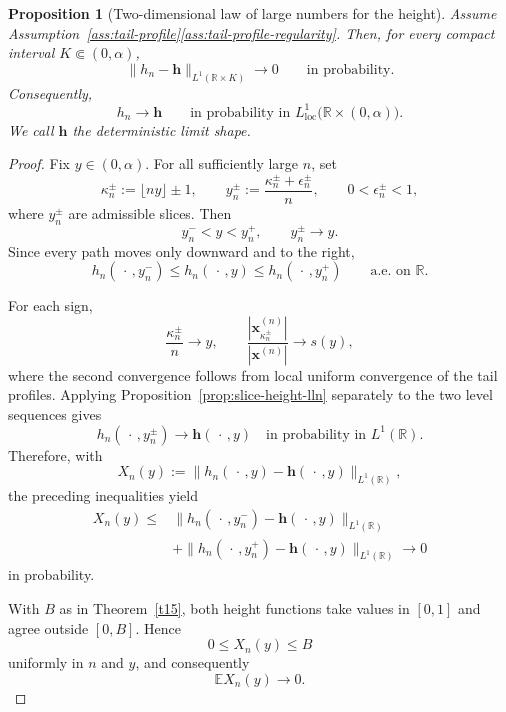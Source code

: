 \documentclass[11pt]{amsart}
\theoremstyle{plain}
\newtheorem{proposition}[theorem]{Proposition}
\numberwithin{equation}{section}
\numberwithin{theorem}{section}
\numberwithin{figure}{section}
\begin{document}
\begin{proposition}[Two-dimensional law of large numbers for the height]
\label{prop:two-dimensional-height-lln}
Assume
Assumption~\ref{ass:tail-profile}\ref{ass:tail-profile-regularity}.
Then, for every compact interval \(K\Subset(0,\alpha)\),
\begin{equation}
    \lVert h_n-\mathbf h\rVert_{L^1(\mathbb R\times K)}
    \longrightarrow0
    \qquad\text{in probability}.
    \label{eq:two-dimensional-height-lln}
\end{equation}
Consequently,
\[
    h_n\longrightarrow\mathbf h
    \qquad\text{in probability in }
    L^1_{\mathrm{loc}}
    \bigl(\mathbb R\times(0,\alpha)\bigr).
\]
We call \(\mathbf h\) the deterministic limit shape.
\end{proposition}

\begin{proof}
Fix \(y\in(0,\alpha)\). For all sufficiently large \(n\), set
\[
    \kappa_n^\pm:=\lfloor ny\rfloor\pm1,
    \qquad
    y_n^\pm
    :=
    \frac{\kappa_n^\pm+\epsilon_n^\pm}{n},
    \qquad
    0<\epsilon_n^\pm<1,
\]
where \(y_n^\pm\) are admissible slices. Then
\[
    y_n^-<y<y_n^+,
    \qquad
    y_n^\pm\longrightarrow y.
\]
Since every path moves only downward and to the right,
\[
    h_n(\,\cdot\,,y_n^-)
    \leq h_n(\,\cdot\,,y)
    \leq h_n(\,\cdot\,,y_n^+)
    \qquad\text{a.e. on }\mathbb R.
\]

For each sign,
\[
    \frac{\kappa_n^\pm}{n}\longrightarrow y,
    \qquad
    \frac{|\mathbf x_{\kappa_n^\pm}^{(n)}|}
         {|\mathbf x^{(n)}|}
    \longrightarrow s(y),
\]
where the second convergence follows from local uniform convergence
of the tail profiles. Applying
Proposition~\ref{prop:slice-height-lln} separately to the two level
sequences gives
\[
    h_n(\,\cdot\,,y_n^\pm)
    \longrightarrow
    \mathbf h(\,\cdot\,,y)
    \quad\text{in probability in }L^1(\mathbb R).
\]
Therefore, with
\[
    X_n(y)
    :=
    \lVert
        h_n(\,\cdot\,,y)-\mathbf h(\,\cdot\,,y)
    \rVert_{L^1(\mathbb R)},
\]
the preceding inequalities yield
\[
\begin{aligned}
    X_n(y)
    \leq{}&
    \lVert
        h_n(\,\cdot\,,y_n^-)-\mathbf h(\,\cdot\,,y)
    \rVert_{L^1(\mathbb R)}
    \\
    &+
    \lVert
        h_n(\,\cdot\,,y_n^+)-\mathbf h(\,\cdot\,,y)
    \rVert_{L^1(\mathbb R)}
    \longrightarrow0
\end{aligned}
\]
in probability.

With \(B\) as in Theorem~\ref{t15}, both height functions take values
in \([0,1]\) and agree outside \([0,B]\). Hence
\[
    0\leq X_n(y)\leq B
\]
uniformly in \(n\) and \(y\), and consequently
\[
    \mathbb E X_n(y)\longrightarrow0.
\]


\end{proof}
\end{document}
